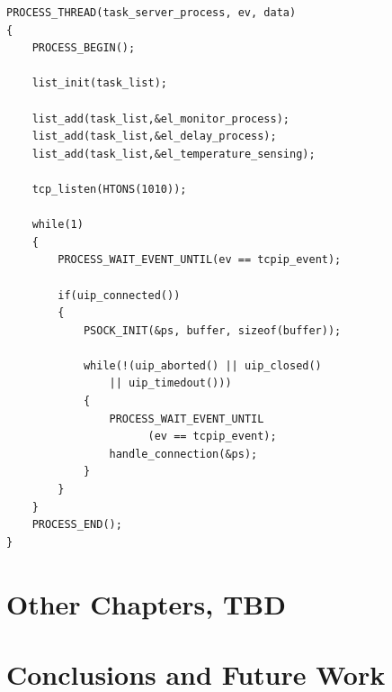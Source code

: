 \documentclass[11pt, oneside, a4paper, oldfontcommands]{memoir}
\begin{document}
\lstset{numbers=left, mathescape=true, nolol=false,caption=Task server snippet,label=lst:taskserver}
\begin{lstlisting}
PROCESS_THREAD(task_server_process, ev, data)
{
	PROCESS_BEGIN();

	list_init(task_list);

	list_add(task_list,&el_monitor_process);
	list_add(task_list,&el_delay_process);
	list_add(task_list,&el_temperature_sensing);

	tcp_listen(HTONS(1010));

	while(1) 
	{
		PROCESS_WAIT_EVENT_UNTIL(ev == tcpip_event);

		if(uip_connected()) 
		{
			PSOCK_INIT(&ps, buffer, sizeof(buffer));

			while(!(uip_aborted() || uip_closed() 
			    || uip_timedout())) 
			{
				PROCESS_WAIT_EVENT_UNTIL
				      (ev == tcpip_event);
				handle_connection(&ps);
			}
		}
	}
	PROCESS_END();
}
\end{lstlisting}

\chapter{Other Chapters, TBD}
\chapter{Conclusions and Future Work}
%
%
%
%

\clearpage




\appendix

%

\backmatter

\end{document}
